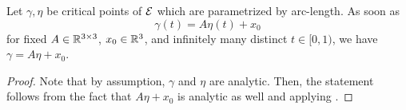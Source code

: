 \begin{corollary}
    Let $\gamma,\eta$ be critical points of $\mathcal{E}$ which are parametrized by arc-length.
    As soon as
    \[
        \gamma(t)=A\eta(t) + x_0
    \]
    for fixed $A\in \mathbb{R}^{3\times 3}$, $x_0 \in \mathbb{R}^3$, and infinitely many distinct $t \in [0,1)$, we have $\gamma = A \eta + x_0$.
\end{corollary}
\begin{proof}
    Note that by assumption, $\gamma$ and $\eta$ are analytic.
    Then, the statement follows from the fact that $A\eta + x_0$ is analytic as well and applying .
\end{proof}
